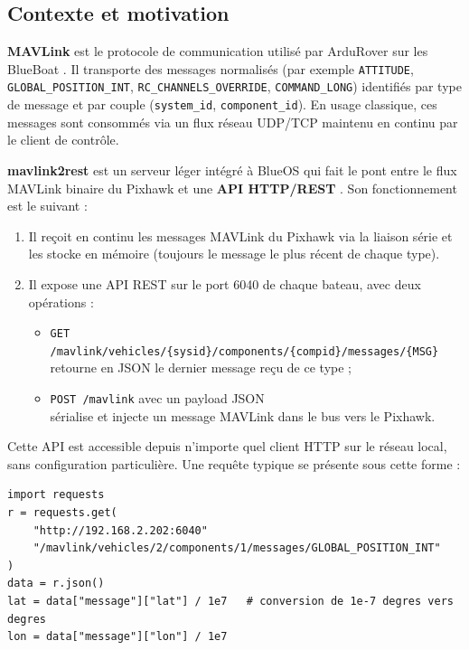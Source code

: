 \subsection{Contexte et motivation}
\label{sec:bblib:contexte}

\textbf{MAVLink} est le protocole de communication utilisé par ArduRover sur les BlueBoat \cite{mavlink_docs,ardurover_docs}. Il transporte des messages normalisés (par exemple \texttt{ATTITUDE}, \texttt{GLOBAL\_POSITION\_INT}, \texttt{RC\_CHANNELS\_OVERRIDE}, \texttt{COMMAND\_LONG}) identifiés par type de message et par couple (\texttt{system\_id}, \texttt{component\_id}). En usage classique, ces messages sont consommés via un flux réseau UDP/TCP maintenu en continu par le client de contrôle.

\textbf{mavlink2rest} est un serveur léger intégré à BlueOS qui fait le pont entre le flux MAVLink binaire du Pixhawk et une \textbf{API HTTP/REST} \cite{blueos_docs,mavlink2rest_docs}. Son fonctionnement est le suivant :

\begin{enumerate}
  \item Il reçoit en continu les messages MAVLink du Pixhawk via la liaison série et les stocke en mémoire (toujours le message le plus récent de chaque type).
  \item Il expose une API REST sur le port 6040 de chaque bateau, avec deux opérations :
  \begin{itemize}
    \item \texttt{GET /mavlink/vehicles/\{sysid\}/components/\{compid\}/messages/\{MSG\}} \\ retourne en JSON le dernier message reçu de ce type ;
    \item \texttt{POST /mavlink} avec un payload JSON \\ sérialise et injecte un message MAVLink dans le bus vers le Pixhawk.
  \end{itemize}
\end{enumerate}

Cette API est accessible depuis n'importe quel client HTTP sur le réseau local, sans configuration particulière. Une requête typique se présente sous cette forme :

\begin{lstlisting}[style=python, caption={Exemple de requête GET vers mavlink2rest pour lire la position GPS du bateau 2.}]
import requests
r = requests.get(
    "http://192.168.2.202:6040"
    "/mavlink/vehicles/2/components/1/messages/GLOBAL_POSITION_INT"
)
data = r.json()
lat = data["message"]["lat"] / 1e7   # conversion de 1e-7 degres vers degres
lon = data["message"]["lon"] / 1e7
\end{lstlisting}

